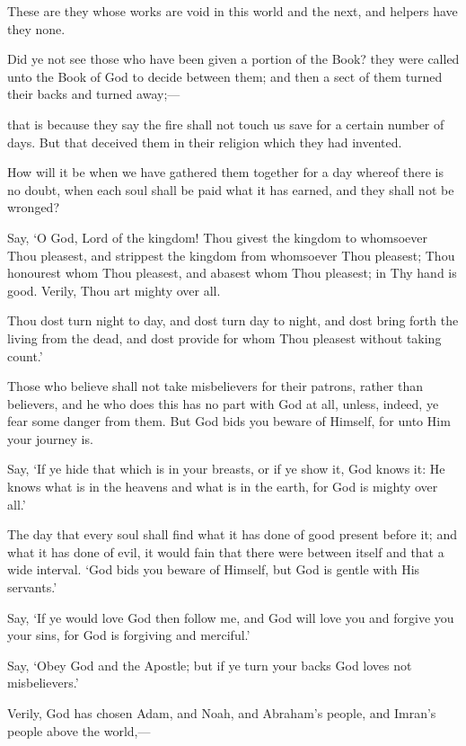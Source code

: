 \documentclass[fontsize=14pt, letterpaper, notitlepage, openany, DIV=12]{scrbook} %
\begin{document}
\noindent[3:22]
These are they whose works are void in this world and the next, and helpers have they
none.

\noindent[3:23]
Did ye not see those who have been given a portion of the Book? they were called unto
the Book of God to decide between them; and then a sect of them turned their backs and turned
away;---

\noindent[3:24]
that is because they say the fire shall not touch us save for a certain number of days. But
that deceived them in their religion which they had invented.

\noindent[3:25]
How will it be when we have gathered them together for a day whereof there is no doubt,
when each soul shall be paid what it has earned, and they shall not be wronged?

\noindent[3:26]
Say, `O God, Lord of the kingdom! Thou givest the kingdom to whomsoever Thou
pleasest, and strippest the kingdom from whomsoever Thou pleasest; Thou honourest whom
Thou pleasest, and abasest whom Thou pleasest; in Thy hand is good. Verily, Thou art mighty
over all.

\noindent[3:27]
Thou dost turn night to day, and dost turn day to night, and dost bring forth the living
from the dead, and dost provide for whom Thou pleasest without taking count.'

\noindent[3:28]
Those who believe shall not take misbelievers for their patrons, rather than believers, and
he who does this has no part with God at all, unless, indeed, ye fear some danger from them. But
God bids you beware of Himself, for unto Him your journey is.

\noindent[3:29]
Say, `If ye hide that which is in your breasts, or if ye show it, God knows it: He knows
what is in the heavens and what is in the earth, for God is mighty over all.'

\noindent[3:30]
The day that every soul shall find what it has done of good present before it; and what it
has done of evil, it would fain that there were between itself and that a wide interval. `God bids
you beware of Himself, but God is gentle with His servants.'

\noindent[3:31]
Say, `If ye would love God then follow me, and God will love you and forgive you your
sins, for God is forgiving and merciful.'

\noindent[3:32]
Say, `Obey God and the Apostle; but if ye turn your backs God loves not misbelievers.'

\noindent[3:33]
Verily, God has chosen Adam, and Noah, and Abraham's people, and Imran's people
above the world,---
\end{document}
